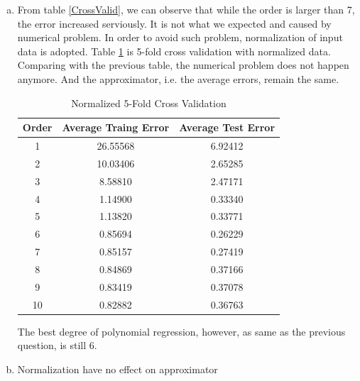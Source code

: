 \documentclass[a4paper, 12pt, titlepage]{article}
\begin{document}
\begin{enumerate}[(a)]
            Figure \ref{f} plots the data and the result of 6-order polynomial regression.

            \begin{figure}[H]
                \centering
                \texttt{[image: fig/6-order.eps]}
                \caption{6-order Regression}\label{g}
            \end{figure}

            Error = 1.0936

        \item From table \ref{CrossValid}, we can observe that while the order is larger than 7, the error increased serviously. It is not what we expected and caused by numerical problem. In order to avoid such problem, normalization of input data is adopted. Table \ref{NCrossValid} is 5-fold cross validation with normalized data. Comparing with the previous table, the numerical problem does not happen anymore. And the approximator, i.e. the average errors, remain the same.
            \begin{table}[H]
                \centering
                \begin{tabular}{ccc}
                Order & Average Traing Error & Average Test Error \\
                    \hline
                1 & 26.55568 & 6.92412 \\
                2 & 10.03406 & 2.65285 \\
                3 & 8.58810  & 2.47171 \\
                4 & 1.14900  & 0.33340 \\
                5 & 1.13820  & 0.33771 \\
                6 & 0.85694  & 0.26229 \\
                7 & 0.85157  & 0.27419 \\
                8 & 0.84869  & 0.37166 \\
                9 & 0.83419  & 0.37078 \\
                10 & 0.82882  & 0.36763 \\
                \end{tabular}
                \caption{Normalized 5-Fold Cross Validation}
                \label{NCrossValid}
            \end{table}

            The best degree of polynomial regression, however, as same as the previous question, is still 6.

        \item Normalization have no effect on approximator


\end{enumerate}
\end{document}
